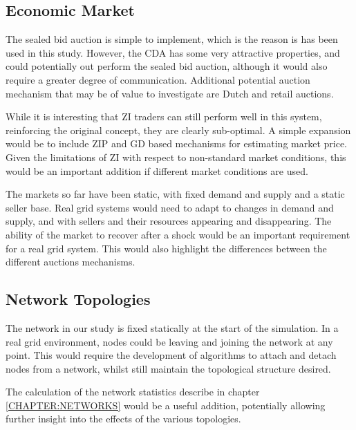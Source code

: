\subsection{Economic Market}

The sealed bid auction is simple to implement, which is the reason is has been
used in this study. However, the CDA has some very attractive properties, and
could potentially out perform the sealed bid auction, although it would also
require a greater degree of communication. Additional potential auction
mechanism that may be of value to investigate are Dutch and retail auctions.

While it is interesting that ZI traders can still perform well in this system,
reinforcing the original concept, they are clearly sub-optimal. A simple
expansion would be to include ZIP and GD based mechanisms for estimating market
price. Given the limitations of ZI with respect to non-standard market
conditions, this would be an important addition if different market conditions
are used.

The markets so far have been static, with fixed demand and supply and a static
seller base. Real grid systems would need to adapt to changes in demand and
supply, and with sellers and their resources appearing and disappearing. The
ability of the market to recover after a shock would be an important
requirement for a real grid system. This would also highlight the differences
between the different auctions mechanisms.


\subsection{Network Topologies} 

The network in our study is fixed statically at the start of the simulation. In
a real grid environment, nodes could be leaving and joining the network at any
point. This would require the development of algorithms to attach and detach
nodes from a network, whilst still maintain the topological structure desired.

The calculation of the network statistics describe in chapter
\ref{CHAPTER:NETWORKS} would be a useful addition, potentially allowing further
insight into the effects of the various topologies.

